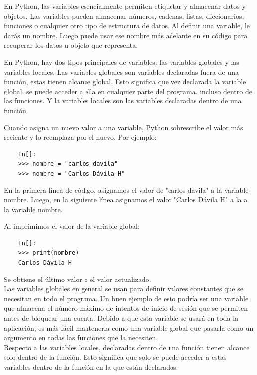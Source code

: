 En Python, las variables esencialmente permiten etiquetar y almacenar datos y objetos. Las variables pueden almacenar  números, cadenas, listas, diccionarios, funciones o cualquier otro tipo de estructura de datos.
Al definir una variable, le darás un nombre. Luego puede usar ese nombre más adelante en su código para recuperar los datos u objeto que representa.

En Python, hay dos tipos principales de variables: las variables globales y  las variables locales.
Las variables globales son variables declaradas fuera de una función, estas tienen alcance global. Esto significa que vez declarada la variable global, se puede acceder a ella en cualquier parte del programa, incluso dentro de las funciones. Y la variables locales son las variables declaradas dentro de una función. 

Cuando asigna un nuevo valor a una variable, Python sobrescribe el valor más reciente y lo reemplaza por el nuevo. Por ejemplo: 

\begin{lstlisting}
	In[]:
	>>> nombre = "carlos davila"
	>>> nombre = "Carlos Dávila H"
\end{lstlisting}En la primera línea de código, asignamos el valor de {\ttfamily {}"{}carlos davila{}"{}} a la variable {\ttfamily nombre}. Luego, en la siguiente línea asignamos el valor {\ttfamily {}"{}Carlos Dávila H{}"{}} a la a la variable {\ttfamily nombre}. 


Al imprimimos el valor de la variable global:

\begin{lstlisting}
	In[]:
	>>> print(nombre)
	Carlos Dávila H
\end{lstlisting}Se obtiene el último valor o el valor actualizado.\\


Las variables globales en general se usan para definir valores constantes que se necesitan en todo el programa. Un buen ejemplo de esto podría ser una variable que almacena el número máximo de intentos de inicio de sesión que se permiten antes de bloquear una cuenta. Debido a que esta variable se usará en toda la aplicación, es más fácil mantenerla como una variable global que pasarla como un argumento en todas las funciones que la necesiten.\\

Respecto a las variables locales, declaradas dentro de una función tienen alcance solo dentro de la función. Esto significa que solo se puede acceder a estas variables dentro de la función en la que están declarados. 


